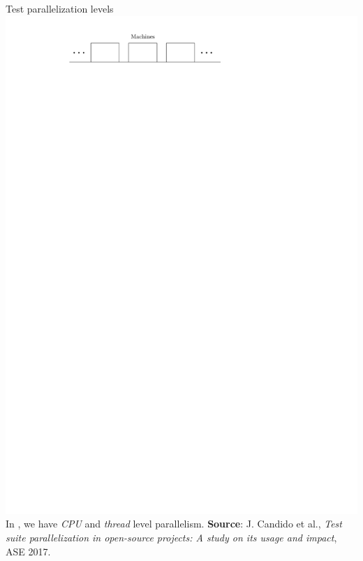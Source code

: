 \documentclass{beamer}
\begin{document}
\begin{frame}{Test parallelization levels}
	\centering
	\includegraphics[width=\linewidth,page=2]{images/intro.pdf}
\vfill
{\color{white}In \tname{}, we have \textit{CPU} and \textit{thread} level parallelism.}
\vfill
{\fontsize{4}{4}\selectfont\textbf{Source}: J. Candido et al., \textit{Test suite parallelization in open-source projects: A study on its usage and impact}, ASE 2017.}
\end{frame}
\end{document}
